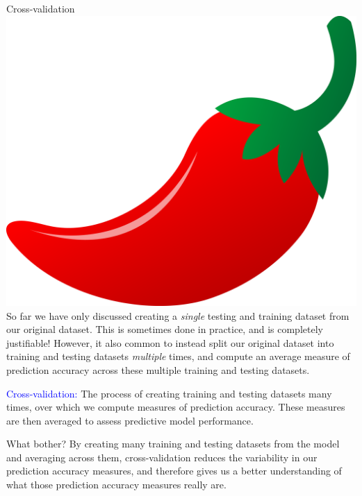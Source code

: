 \documentclass[10pt,t]{beamer}
\begin{document}
\begin{frame}{Cross-validation \includegraphics[scale=0.01]{chilipepper.png} }
So far we have only discussed creating a \textit{single} testing and training dataset from our original dataset. This is sometimes done in practice, and is completely justifiable! However, it also common to instead split our original dataset into training and testing datasets \textit{multiple} times, and compute an average measure of prediction accuracy across these multiple training and testing datasets.

\vspace{0.3cm}

\textcolor{blue}{Cross-validation:} The process of creating training and testing datasets many times, over which we compute measures of prediction accuracy. These measures are then averaged to assess predictive model performance.

\vspace{0.3cm}

What bother? By creating many training and testing datasets from the model and averaging across them, cross-validation reduces the variability in our prediction accuracy measures, and therefore gives us a better understanding of what those prediction accuracy measures really are.

\end{frame}
\end{document}
